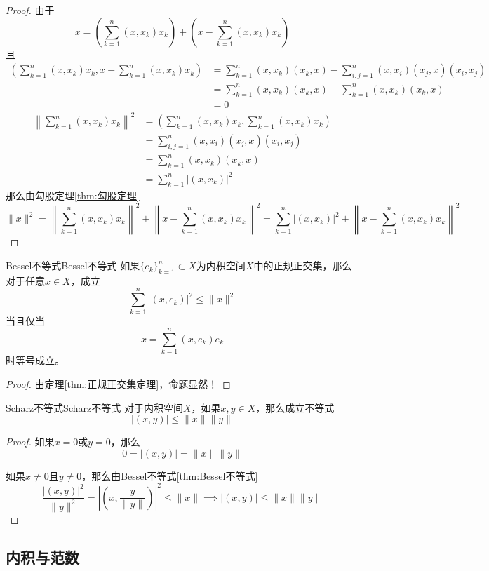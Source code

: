 \documentclass[lang = cn, scheme = chinese, thmcnt = section]{elegantbook}
\newcommand{\sub}{\subset}             %
\begin{document}
\begin{proof}
	由于
	$$
	x = \left(\sum_{k=1}^{n}(x,x_k)x_k\right)+\left(x-\sum_{k=1}^{n}(x,x_k)x_k\right)
	$$
	且
	\begin{align*}
		\left(\sum_{k=1}^{n}(x,x_k)x_k,x-\sum_{k=1}^{n}(x,x_k)x_k\right)
		& = \sum_{k=1}^{n}(x,x_k)(x_k,x)-\sum_{i,j=1}^{n}(x,x_i)(x_j,x)(x_i,x_j)\\
		& =\sum_{k=1}^{n}(x,x_k)(x_k,x)-\sum_{k=1}^{n}(x,x_k)(x_k,x)\\
		& =0
	\end{align*}
	\begin{align*}
		\left\| \sum_{k=1}^{n}(x,x_k)x_k \right\|^2
		& = \left(\sum_{k=1}^{n}(x,x_k)x_k,\sum_{k=1}^{n}(x,x_k)x_k\right)\\
		& = \sum_{i,j=1}^{n}(x,x_i)(x_j,x)(x_i,x_j)\\
		& = \sum_{k=1}^{n}(x,x_k)(x_k,x)\\
		& = \sum_{k=1}^{n}|(x,x_k)|^2
	\end{align*}
	那么由勾股定理\ref{thm:勾股定理}
	$$
	\| x \|^2=\left\| \sum_{k=1}^{n}(x,x_k)x_k \right\|^2+\left\| x-\sum_{k=1}^{n}(x,x_k)x_k \right\|^2
	= \sum_{k=1}^{n}|(x,x_k)|^2+\left\| x-\sum_{k=1}^{n}(x,x_k)x_k \right\|^2
	$$
\end{proof}

\begin{theorem}{Bessel不等式}{Bessel不等式}
	如果$\{e_k\}_{k=1}^n\sub X$为内积空间$X$中的正规正交集，那么对于任意$x\in X$​，成立
	$$
	\sum_{k=1}^{n}|(x,e_k)|^2 \le \| x \|^2
	$$
	当且仅当
	$$
	x=\sum_{k=1}^{n}(x,e_k)e_k
	$$
	时等号成立。
\end{theorem}

\begin{proof}
	由定理\ref{thm:正规正交集定理}，命题显然！
\end{proof}

\begin{theorem}{Scharz不等式}{Scharz不等式}
	对于内积空间$X$，如果$x,y\in X$，那么成立不等式
	$$
	|(x,y)|\le \|x\|\|y\|
	$$
\end{theorem}

\begin{proof}
	如果$x=0$或$y=0$，那么
	$$
	0=|(x,y)|=\|x\|\|y\|
	$$
	
	如果$x\ne0$且$y\ne 0$，那么由Bessel不等式\ref{thm:Bessel不等式}
	$$
	\frac{|(x,y)|^2}{\|y\|^2}
	=\left| \left(x,\frac{y}{\|y\|}\right) \right|^2
	\le \|x\|
	\implies
	|(x,y)|\le \|x\|\|y\|
	$$
\end{proof}

\subsection{内积与范数}
\end{document}

